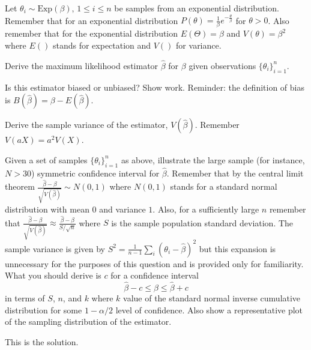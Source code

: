 \documentclass[12pt]{article}
\begin{document}
{

Let $\theta_i \sim \mathrm{Exp}(\beta), \, 1 \leq i \leq n$ be samples from an
exponential distribution.  Remember that for an exponential distribution
$P(\theta) = \frac{1}{\beta} e^{-\frac{\theta}{\beta}}$ for $\theta > 0$.  Also
remember that for the exponential distribution $E(\Theta) = \beta$ and $V(\theta) = \beta^2$ where $E()$ stands for
expectation and $V()$ for variance.
\abcs
\item
Derive the maximum likelihood estimator $\hat \beta$ for $\beta$ given observations $\{\theta_i\}_{i=1}^n$.
\item
Is this estimator biased or unbiased?  Show work.  Reminder: the definition of bias is $B(\hat \beta) = \beta - E(\hat \beta)$.
\item
Derive the sample variance of the estimator, $V(\hat \beta)$.  Remember $V(aX) = a^2V(X)$.
\item
Given a set of samples $\{\theta_i\}_{i=1}^n$ as above, illustrate the large
sample (for instance, $N > 30$) symmetric confidence interval for $\hat \beta$.  Remember that by the central limit theorem $\frac{\hat \beta - \beta}{\sqrt{V(\hat \beta)}} \sim N(0,1)$ where $N(0,1)$ stands for a standard normal distribution with mean $0$ and variance $1$.  Also, for a sufficiently large $n$ remember that $\frac{\hat \beta - \beta}{\sqrt{V(\hat \beta)}} \approx \frac{\hat \beta - \beta}{S/\sqrt{n}}$ where $S$ is the sample population standard deviation.  The sample variance is
given by $S^2 = \frac{1}{n-1} \sum_i (\theta_i - \hat \beta)^2$ but
this expansion is unnecessary for the purposes of this question and is provided only for familiarity.  What
you should derive is $c$ for a confidence interval 
\[ \hat \beta - c \leq \beta \leq \hat \beta + c \] 
in terms of $S$, $n$, and $k$ where $k$ value of the standard normal inverse cumulative distribution for some $1-\alpha/2$ level of confidence.  Also show a representative plot of the sampling distribution of the estimator.
\endabcs
}
{
\vspace{7in}
\vfill
}
{

This is the solution.  
}


\problemsdone
\end{document}
